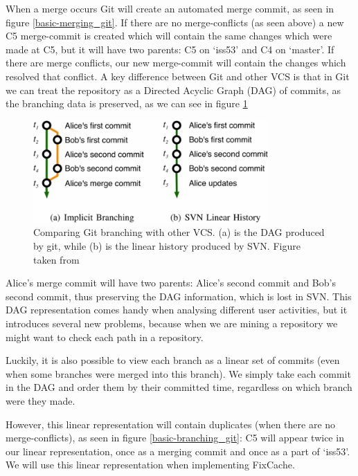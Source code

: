\documentclass[12pt,twoside,notitlepage]{report}
\newcommand{\fxch}{FixCache}
\begin{document}
When a merge occurs Git will create an automated merge commit, as seen in figure \ref{basic-merging_git}. If there are no merge-conflicts (as seen above) a new C5 merge-commit is created which will contain the same changes which were made at C5, but it will have two parents: C5 on `iss53' and C4 on `master'. If there are merge conflicts, our new merge-commit will contain the changes which resolved that conflict.
\clearpage
A key difference between Git and other VCS is that in Git we can treat the repository as a Directed Acyclic Graph (DAG) of commits, as the branching data is preserved, as we can see in figure \ref{branching}
\begin{figure}[h]
\includegraphics[width=0.8\textwidth]{branching.png}
\centering

\captionsetup{width=0.8\textwidth}
\caption[Comparing Git branching with other VCS]{Comparing Git branching with other VCS. (a) is the DAG produced by git, while (b) is the linear history produced by SVN. Figure taken from \cite{Git}}
\label{branching}
\end{figure}

Alice's merge commit will have two parents: Alice's second commit and Bob's second commit, thus preserving the DAG information, which is lost in SVN. This DAG representation comes handy when analysing different user activities, but it introduces several new problems, because when we are mining a repository we might want to check each path in a repository. 

Luckily, it is also possible to view each branch as a linear set of commits (even when some branches were merged into this branch). We simply take each commit in the DAG and order them by their committed time, regardless on which branch were they made.

However, this linear representation will contain duplicates (when there are no merge-conflicts), as seen in figure \ref{basic-branching_git}:  C5 will appear twice in our linear representation, once as a merging commit and once as a part of `iss53'. We will use this linear representation when implementing \fxch{}.
\end{document}
